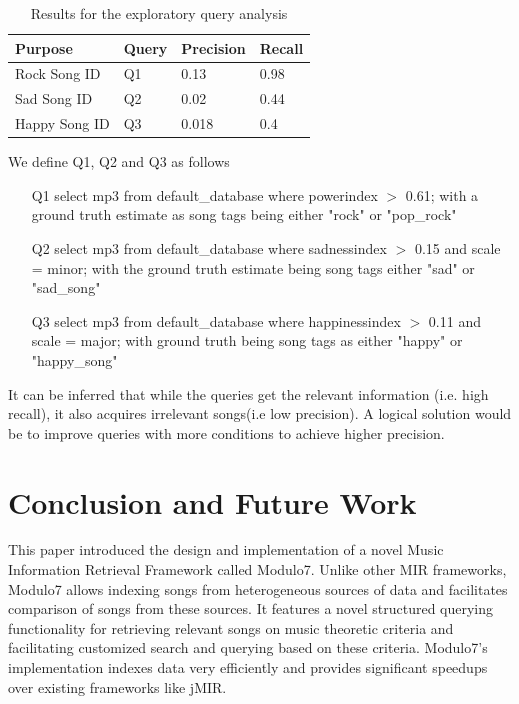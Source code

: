 \documentclass{article}
\begin{document}
\begin{table}[!htb]
\begin{center}
    \begin{tabular}{| l | l | l | l |}
    \hline
    Purpose &  Query & Precision  & Recall \\ \hline
    Rock Song ID &  Q1 & 0.13  & 0.98 \\ \hline
    Sad Song ID &  Q2 & 0.02  & 0.44 \\ \hline
    Happy Song ID &  Q3 & 0.018  & 0.4 \\
    \hline
    \end{tabular}
\end{center}
\caption{Results for the exploratory query analysis}
\end{table}


\noindent We define Q1, Q2 and Q3 as follows

\begin{enumerate}
\item [Q1] select mp3 from default\_database where powerindex $>$ 0.61; with a ground truth estimate as song tags being either "rock" or "pop\_rock"
\item [Q2] select mp3 from default\_database where sadnessindex $>$ 0.15 and scale = minor; with the ground truth estimate being song tags either "sad" or "sad\_song" 
\item [Q3] select mp3 from default\_database where happinessindex $>$ 0.11 and scale = major; with ground truth being song tags as either "happy" or "happy\_song"
\end{enumerate}

\noindent It can be inferred that while the queries get the relevant information (i.e. high recall), it also acquires irrelevant songs(i.e low precision). A logical solution would be to improve queries with more conditions to achieve higher precision.   


\section{Conclusion and Future Work}

\noindent This paper introduced the design and implementation of a novel Music Information Retrieval Framework called Modulo7. Unlike other MIR frameworks, Modulo7 allows indexing songs from heterogeneous sources of data and facilitates comparison of songs from these sources. It features a novel structured querying functionality for retrieving relevant songs on music theoretic criteria and facilitating customized search and querying based on these criteria. Modulo7's implementation indexes data very efficiently and provides significant speedups over existing frameworks like jMIR. \\
\end{document}
